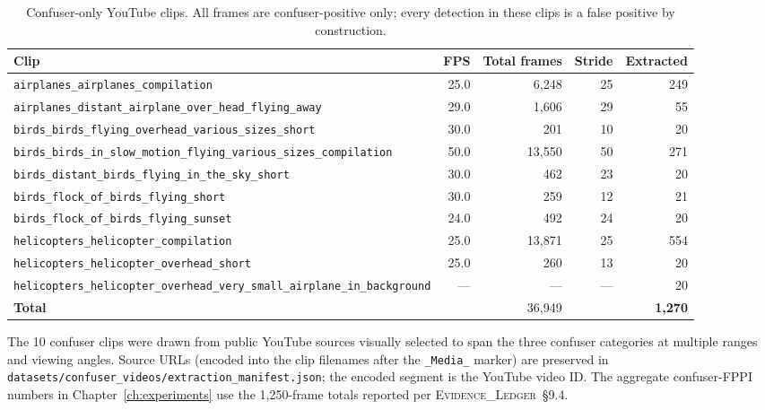 \documentclass[12pt,a4paper,oneside,openright]{book}
\begin{document}
\begin{table}[htbp]
    \centering
    \caption{Confuser-only YouTube clips. All frames are confuser-positive only; every detection in these clips is a false positive by construction.}
    \label{tab:youtube_confuser_clips}
    \begin{tabular}{lrrrr}
        \toprule
        Clip & FPS & Total frames & Stride & Extracted \\
        \midrule
        \texttt{airplanes\_airplanes\_compilation}             & 25.0 & 6{,}248 & 25 & 249 \\
        \texttt{airplanes\_distant\_airplane\_over\_head\_flying\_away} & 29.0 & 1{,}606 & 29 & 55 \\
        \texttt{birds\_birds\_flying\_overhead\_various\_sizes\_short} & 30.0 & 201 & 10 & 20 \\
        \texttt{birds\_birds\_in\_slow\_motion\_flying\_various\_sizes\_compilation} & 50.0 & 13{,}550 & 50 & 271 \\
        \texttt{birds\_distant\_birds\_flying\_in\_the\_sky\_short} & 30.0 & 462 & 23 & 20 \\
        \texttt{birds\_flock\_of\_birds\_flying\_short}        & 30.0 & 259 & 12 & 21 \\
        \texttt{birds\_flock\_of\_birds\_flying\_sunset}      & 24.0 & 492 & 24 & 20 \\
        \texttt{helicopters\_helicopter\_compilation}          & 25.0 & 13{,}871 & 25 & 554 \\
        \texttt{helicopters\_helicopter\_overhead\_short}      & 25.0 & 260 & 13 & 20 \\
        \texttt{helicopters\_helicopter\_overhead\_very\_small\_airplane\_in\_background} & --- & --- & --- & 20 \\
        \midrule
        \textbf{Total} & & 36{,}949 & & \textbf{1{,}270} \\
        \bottomrule
    \end{tabular}
\end{table}

\noindent The 10 confuser clips were drawn from public YouTube sources visually selected to span the three confuser categories at multiple ranges and viewing angles. Source URLs (encoded into the clip filenames after the \texttt{\_Media\_} marker) are preserved in \texttt{datasets/confuser\_videos/extraction\_manifest.json}; the encoded segment is the YouTube video ID. The aggregate confuser-FPPI numbers in Chapter~\ref{ch:experiments} use the 1{,}250-frame totals reported per \textsc{Evidence\_Ledger}~\S9.4.
\end{document}
